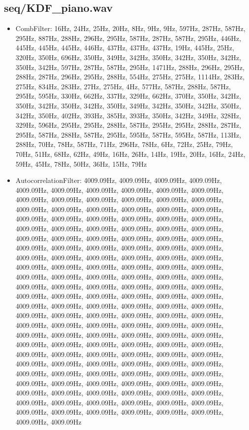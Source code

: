 \documentclass{classrep}
\begin{document}
\subsection{seq/KDF\_piano.wav}
\begin{itemize}
 \item CombFilter: 16Hz, 24Hz, 25Hz, 20Hz, 8Hz, 9Hz, 9Hz, 597Hz, 287Hz, 587Hz, 295Hz, 887Hz, 288Hz, 296Hz, 295Hz, 587Hz, 287Hz, 587Hz, 295Hz, 446Hz, 445Hz, 445Hz, 445Hz, 446Hz, 437Hz, 437Hz, 437Hz, 19Hz, 445Hz, 25Hz, 320Hz, 350Hz, 696Hz, 350Hz, 349Hz, 342Hz, 350Hz, 342Hz, 350Hz, 342Hz, 350Hz, 342Hz, 597Hz, 287Hz, 587Hz, 295Hz, 1471Hz, 288Hz, 296Hz, 295Hz, 288Hz, 287Hz, 296Hz, 295Hz, 288Hz, 554Hz, 275Hz, 275Hz, 1114Hz, 283Hz, 275Hz, 834Hz, 283Hz, 27Hz, 275Hz, 4Hz, 577Hz, 587Hz, 288Hz, 587Hz, 295Hz, 595Hz, 330Hz, 662Hz, 337Hz, 329Hz, 662Hz, 370Hz, 350Hz, 342Hz, 350Hz, 342Hz, 350Hz, 342Hz, 350Hz, 349Hz, 342Hz, 350Hz, 342Hz, 350Hz, 342Hz, 350Hz, 402Hz, 393Hz, 385Hz, 393Hz, 350Hz, 342Hz, 349Hz, 328Hz, 329Hz, 596Hz, 295Hz, 295Hz, 288Hz, 587Hz, 295Hz, 295Hz, 288Hz, 287Hz, 295Hz, 587Hz, 288Hz, 587Hz, 295Hz, 595Hz, 587Hz, 595Hz, 587Hz, 113Hz, 288Hz, 70Hz, 78Hz, 587Hz, 71Hz, 296Hz, 78Hz, 6Hz, 72Hz, 25Hz, 79Hz, 70Hz, 51Hz, 68Hz, 62Hz, 49Hz, 16Hz, 26Hz, 14Hz, 19Hz, 20Hz, 16Hz, 24Hz, 59Hz, 45Hz, 78Hz, 50Hz, 36Hz, 15Hz, 79Hz
 \item AutocorrelationFilter: 4009.09Hz, 4009.09Hz, 4009.09Hz, 4009.09Hz, 4009.09Hz, 4009.09Hz, 4009.09Hz, 4009.09Hz, 4009.09Hz, 4009.09Hz, 4009.09Hz, 4009.09Hz, 4009.09Hz, 4009.09Hz, 4009.09Hz, 4009.09Hz, 4009.09Hz, 4009.09Hz, 4009.09Hz, 4009.09Hz, 4009.09Hz, 4009.09Hz, 4009.09Hz, 4009.09Hz, 4009.09Hz, 4009.09Hz, 4009.09Hz, 4009.09Hz, 4009.09Hz, 4009.09Hz, 4009.09Hz, 4009.09Hz, 4009.09Hz, 4009.09Hz, 4009.09Hz, 4009.09Hz, 4009.09Hz, 4009.09Hz, 4009.09Hz, 4009.09Hz, 4009.09Hz, 4009.09Hz, 4009.09Hz, 4009.09Hz, 4009.09Hz, 4009.09Hz, 4009.09Hz, 4009.09Hz, 4009.09Hz, 4009.09Hz, 4009.09Hz, 4009.09Hz, 4009.09Hz, 4009.09Hz, 4009.09Hz, 4009.09Hz, 4009.09Hz, 4009.09Hz, 4009.09Hz, 4009.09Hz, 4009.09Hz, 4009.09Hz, 4009.09Hz, 4009.09Hz, 4009.09Hz, 4009.09Hz, 4009.09Hz, 4009.09Hz, 4009.09Hz, 4009.09Hz, 4009.09Hz, 4009.09Hz, 4009.09Hz, 4009.09Hz, 4009.09Hz, 4009.09Hz, 4009.09Hz, 4009.09Hz, 4009.09Hz, 4009.09Hz, 4009.09Hz, 4009.09Hz, 4009.09Hz, 4009.09Hz, 4009.09Hz, 4009.09Hz, 4009.09Hz, 4009.09Hz, 4009.09Hz, 4009.09Hz, 4009.09Hz, 4009.09Hz, 4009.09Hz, 4009.09Hz, 4009.09Hz, 4009.09Hz, 4009.09Hz, 4009.09Hz, 4009.09Hz, 4009.09Hz, 4009.09Hz, 4009.09Hz, 4009.09Hz, 4009.09Hz, 4009.09Hz, 4009.09Hz, 4009.09Hz, 4009.09Hz, 4009.09Hz, 4009.09Hz, 4009.09Hz, 4009.09Hz, 4009.09Hz, 4009.09Hz, 4009.09Hz, 4009.09Hz, 4009.09Hz, 4009.09Hz, 4009.09Hz, 4009.09Hz, 4009.09Hz, 4009.09Hz, 4009.09Hz, 4009.09Hz, 4009.09Hz, 4009.09Hz, 4009.09Hz, 4009.09Hz, 4009.09Hz, 4009.09Hz, 4009.09Hz, 4009.09Hz, 4009.09Hz, 4009.09Hz, 4009.09Hz, 4009.09Hz, 4009.09Hz, 4009.09Hz, 4009.09Hz, 4009.09Hz, 4009.09Hz, 4009.09Hz, 4009.09Hz, 4009.09Hz, 4009.09Hz, 4009.09Hz, 4009.09Hz, 4009.09Hz, 4009.09Hz, 4009.09Hz
\end{itemize}
\end{document}
